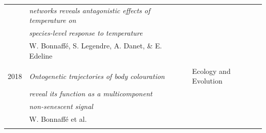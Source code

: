 \documentclass[11pt, oneside]{article}   	%
\begin{document}
\begin{tabular}{rll}
& \textit{networks reveals antagonistic effects of temperature on} & \\
& \textit{species-level response to temperature} & \\
& W. Bonnaff\'e, S. Legendre, A. Danet, \& E. Edeline & \\
\\
2018 & \textit{Ontogenetic trajectories of body colouration} & Ecology and Evolution \\ 
& \textit{reveal its function as a multicomponent} & \\
& \textit{non-senescent signal} &  \\
& W. Bonnaff\'e et al. \\
\\
\end{tabular}
\end{document}
